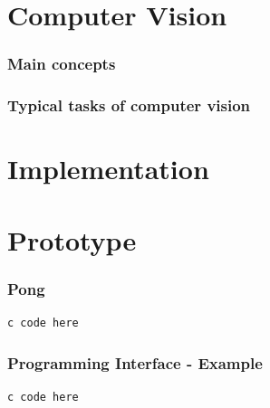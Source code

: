 \documentclass{beamer}
\begin{document}
\section{Computer Vision}

\begin{frame}
\frametitle{Main concepts}
\end{frame}
\begin{frame}
\frametitle{Typical tasks of computer vision}

\end{frame}
\section{Implementation}
\begin{frame}
\frametitle{}
\end{frame}
\begin{frame}
\frametitle{}
\end{frame}
\begin{frame}
\frametitle{}
\end{frame}
\begin{frame}
\frametitle{}
\end{frame}
\begin{frame}
\frametitle{}
\end{frame}
\section{Prototype}
\begin{frame}[fragile]
\frametitle{Pong}
\begin{lstlisting}
c code here
\end{lstlisting}
\end{frame}
\begin{frame}[fragile]
\frametitle{Programming Interface - Example}
\begin{lstlisting}
c code here
\end{lstlisting}
\end{frame}
\end{document}
